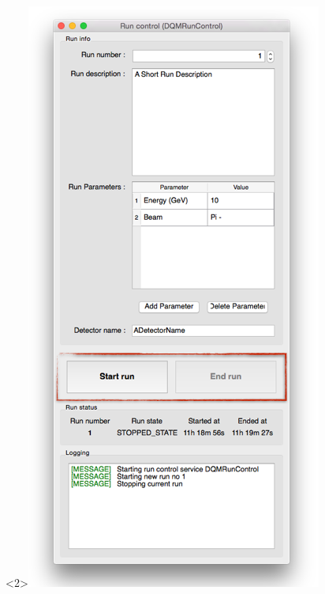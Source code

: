 \documentclass[8pt]{beamer}
\begin{document}
\begin{frame}
\begin{center}
\begin{overlayarea}{\textwidth}{\textheight}
\begin{columns}
\begin{center}
          \begin{onlyenv}<2>\includegraphics[width=\textwidth]{figs/RunControl/RunControl_SOR.png}\end{onlyenv}

\end{center}
\end{columns}
\end{overlayarea}
\end{center}
\end{frame}
\end{document}
